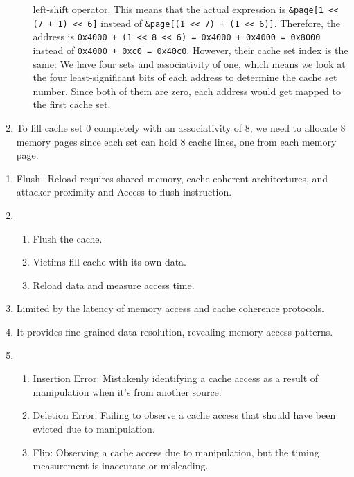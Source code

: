 \documentclass[sheet=2, prefix, english]{dexercise}
\begin{document}
\begin{enumerate}
\begin{enumerate}
        left-shift operator.
        This means that the actual expression is \texttt{\&page[1 << (7 + 1) << 6]}
        instead of \texttt{\&page[(1 << 7) + (1 << 6)]}.
        Therefore, the address is \texttt{0x4000 + (1 << 8 << 6) = 0x4000 +
        0x4000 = 0x8000} instead of \texttt{0x4000 + 0xc0 = 0x40c0}.
        However, their cache set index is the same:
        We have four sets and associativity of one, which means we look at the
        four least-significant bits of each address to determine the cache set
        number.
        Since both of them are zero, each address would get mapped to the first
        cache set.
    \end{enumerate}
  \item
    To fill cache set 0 completely with an associativity of 8, we need to
    allocate 8 memory pages since each set can hold 8 cache lines, one from
    each memory page.
\end{enumerate}


\begin{enumerate}
  \item
  Flush+Reload requires shared memory, cache-coherent architectures, and
    attacker proximity and Access to flush instruction.
  \item
    \begin{enumerate}
      \item Flush the cache.
      \item Victims fill cache with its own data.
      \item Reload data and measure access time.
    \end{enumerate}
  \item Limited by the latency of memory access and cache coherence protocols.
  \item It provides fine-grained data resolution, revealing memory access patterns.
  \item
    \begin{enumerate}
      \item Insertion Error: Mistakenly identifying a cache access as a result
        of manipulation when it's from another source.
      \item Deletion Error: Failing to observe a cache access that should have
        been evicted due to manipulation.
      \item Flip: Observing a cache access due to manipulation, but the timing
        measurement is inaccurate or misleading.
    \end{enumerate}

\end{enumerate}
\end{document}
